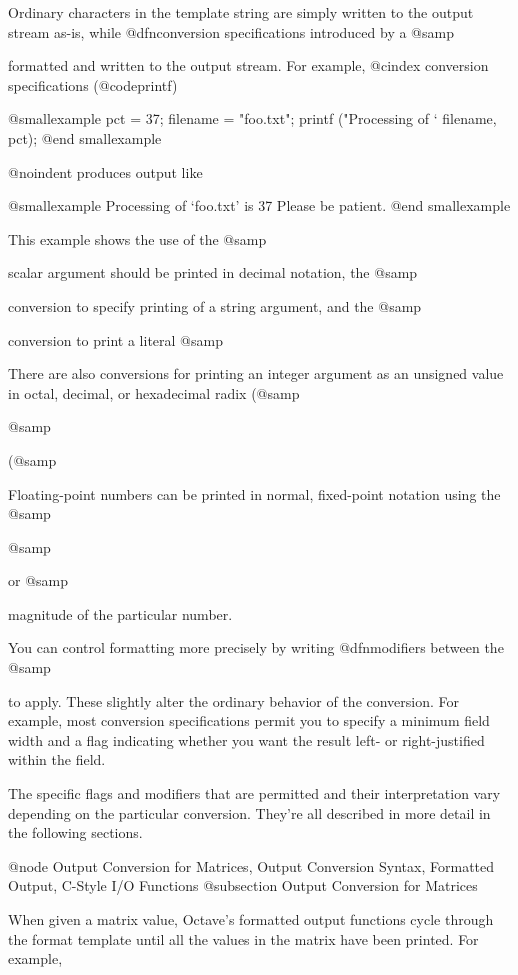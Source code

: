 Ordinary characters in the template string are simply written to the
output stream as-is, while @dfn{conversion specifications} introduced by
a @samp{%
formatted and written to the output stream.  For example,
@cindex conversion specifications (@code{printf})

@smallexample
pct = 37;
filename = "foo.txt";
printf ("Processing of `%
        filename, pct);
@end smallexample

@noindent
produces output like

@smallexample
Processing of `foo.txt' is 37%
Please be patient.
@end smallexample

This example shows the use of the @samp{%
scalar argument should be printed in decimal notation, the @samp{%
conversion to specify printing of a string argument, and the @samp{%
conversion to print a literal @samp{%

There are also conversions for printing an integer argument as an
unsigned value in octal, decimal, or hexadecimal radix (@samp{%
@samp{%
(@samp{%

Floating-point numbers can be printed in normal, fixed-point notation
using the @samp{%
@samp{%
or @samp{%
magnitude of the particular number.

You can control formatting more precisely by writing @dfn{modifiers}
between the @samp{%
to apply.  These slightly alter the ordinary behavior of the conversion.
For example, most conversion specifications permit you to specify a
minimum field width and a flag indicating whether you want the result
left- or right-justified within the field.

The specific flags and modifiers that are permitted and their
interpretation vary depending on the particular conversion.  They're all
described in more detail in the following sections.

@node Output Conversion for Matrices, Output Conversion Syntax, Formatted Output, C-Style I/O Functions
@subsection Output Conversion for Matrices

When given a matrix value, Octave's formatted output functions cycle
through the format template until all the values in the matrix have been
printed.  For example,

}}}}}}}}}}}}
